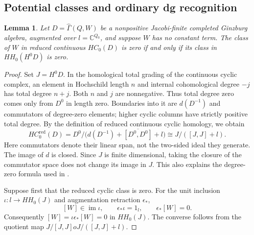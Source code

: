 \documentclass[12pt,a4paper,english,reqno]{amsart}
\theoremstyle{plain}
\newtheorem{lem}[thm]{Lemma}
\theoremstyle{definition}
\numberwithin{equation}{section}
\def\io{\iota}
\def\Ga{\Gamma}
\def\bbC{{\mathbb C}}
\def\iso{\cong}
\begin{document}
\subsection{Potential classes and ordinary dg recognition}
\begin{lem}\label{lem:cyclic-zero}
Let $D=\widehat\Ga(Q,W)$ be a nonpositive Jacobi-finite completed Ginzburg algebra, augmented over $l=\bbC^{Q_0}$, and suppose $W$ has no constant term. The class of $W$ in reduced continuous $HC_0(D)$ is zero if and only if its class in $HH_0(H^0D)$ is zero.
\end{lem}
\begin{proof}
Set $J=H^0D$. In the homological total grading of the continuous cyclic complex, an element in Hochschild length $n$ and internal cohomological degree $-j$ has total degree $n+j$. Both $n$ and $j$ are nonnegative. Thus total degree zero comes only from $D^0$ in length zero. Boundaries into it are $d(D^{-1})$ and commutators of degree-zero elements; higher cyclic columns have strictly positive total degree. By the definition of reduced continuous cyclic homology, we obtain
\[
 HC^{\mathrm{red}}_0(D)
 =D^0\big/\bigl(d(D^{-1})+
       \overline{[D^0,D^0]}+l\bigr)
 \iso J/([J,J]+l).
\]
Here commutators denote their linear span, not the two-sided ideal they generate. The image of $d$ is closed. Since $J$ is finite dimensional, taking the closure of the commutator space does not change its image in $J$. This also explains the degree-zero formula used in \cite[Section 4.5]{HK}.

Suppose first that the reduced cyclic class is zero. For the unit inclusion $\io:l\to HH_0(J)$ and augmentation retraction $\epsilon_*$,
\[
 [W]\in\operatorname{im}\io,\qquad
 \epsilon_*\io=1_l,\qquad \epsilon_*[W]=0.
\]
Consequently $[W]=\io\epsilon_*[W]=0$ in $HH_0(J)$. The converse follows from the quotient map $J/[J,J]	o J/([J,J]+l)$.
\end{proof}
\end{document}
